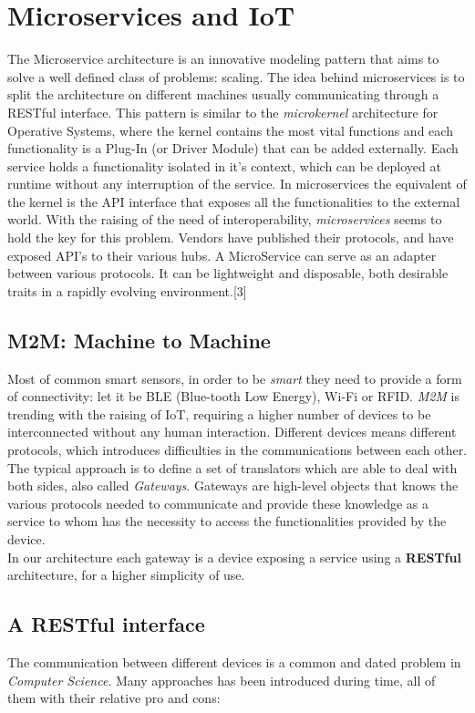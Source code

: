 \section{Microservices and IoT}

The Microservice architecture is an innovative modeling pattern that aims
to solve a well defined class of problems: scaling.
The idea behind microservices is to split the architecture on different machines
usually communicating through a RESTful interface.
This pattern is similar to the \textit{microkernel} architecture for Operative Systems,
where the kernel contains the most vital functions and each functionality is a Plug-In
(or Driver Module) that can be added externally.
Each service holds a functionality isolated in it's context, which can be deployed
at runtime without any interruption of the service. In microservices the
equivalent of the kernel is the API interface that exposes all the functionalities
to the external world.
With the raising of the need of interoperability, \textit{microservices}
seems to hold the key for this problem.
Vendors have published their protocols, and have exposed API’s to their various hubs.
A MicroService can serve as an adapter between various protocols. It can be lightweight and disposable,
both desirable traits in a rapidly evolving environment.[3]

\subsection{M2M: Machine to Machine}

Most of common smart sensors, in order to be \textit{smart} they need
to provide a form of connectivity: let it be BLE (Blue-tooth Low Energy),
Wi-Fi or RFID. \textit{M2M} is trending with the raising of IoT,
requiring a higher number of devices to be interconnected without
any human interaction. Different devices means different protocols,
which introduces difficulties in the communications between each other.
The typical approach is to define a set of translators which
are able to deal with both sides, also called \textit{Gateways}.
Gateways are high-level objects that knows the various protocols
needed to communicate and provide these knowledge as a service to
whom has the necessity to access the functionalities provided by the
device. \\
In our architecture each gateway is a device exposing a service using
a \textbf{RESTful} architecture, for a higher simplicity of use.

\subsection{A RESTful interface}
The communication between different devices is a common and dated
problem in \textit{Computer Science}. Many approaches has been introduced
during time, all of them with their relative pro and cons:

